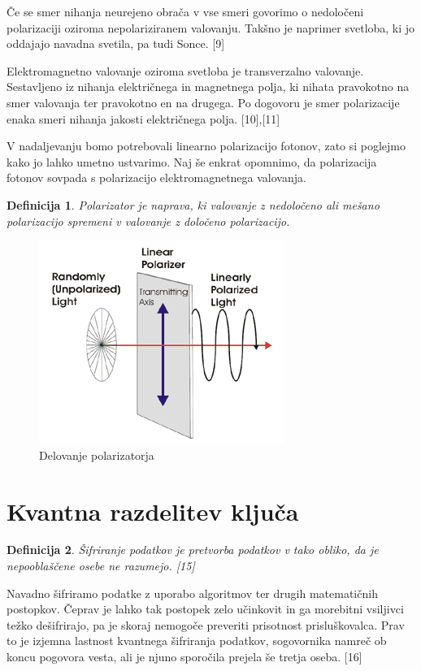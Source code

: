 \documentclass[A4paper, 11pt]{article}
\newtheorem{definicija}{Definicija}
\begin{document}
Če se smer nihanja neurejeno obrača v vse smeri govorimo o nedoločeni polarizaciji oziroma nepolariziranem valovanju. Takšno je naprimer svetloba, ki jo oddajajo navadna svetila, pa tudi Sonce. [9]

Elektromagnetno valovanje oziroma svetloba je transverzalno valovanje. Sestavljeno iz nihanja električnega in magnetnega polja, ki nihata pravokotno na smer valovanja ter pravokotno en na drugega. Po dogovoru je smer polarizacije enaka smeri nihanja jakosti električnega polja. [10],[11]

V nadaljevanju bomo potrebovali linearno polarizacijo fotonov, zato si poglejmo kako jo lahko umetno ustvarimo. Naj še enkrat opomnimo, da polarizacija fotonov sovpada s polarizacijo elektromagnetnega valovanja. 

\begin{definicija}
Polarizator je naprava, ki valovanje z nedoločeno ali mešano polarizacijo spremeni v valovanje z določeno polarizacijo.
\end{definicija}

\begin{figure}[h]
\centering
\caption{Delovanje polarizatorja}
\includegraphics[scale=0.7]{linear-figure-1}
\end{figure}



\section{Kvantna razdelitev ključa}

\begin{definicija}
Šifriranje podatkov je pretvorba podatkov v tako obliko, da je nepooblaščene osebe ne razumejo. [15]
\end{definicija}

Navadno šifriramo podatke z uporabo algoritmov ter drugih matematičnih postopkov. Čeprav je lahko tak postopek zelo učinkovit in ga morebitni vsiljivci težko dešifrirajo, pa je skoraj nemogoče preveriti prisotnost prisluškovalca. Prav to je izjemna lastnost kvantnega šifriranja podatkov, sogovornika namreč ob koncu pogovora vesta, ali je njuno sporočila prejela še tretja oseba. [16]
\end{document}
